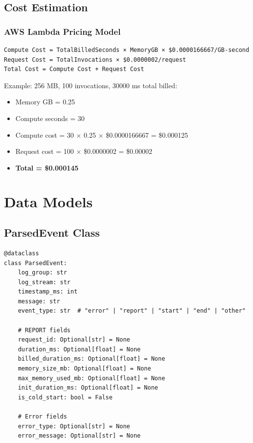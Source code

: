 \documentclass[12pt,a4paper]{article}
\begin{document}
\subsection{Cost Estimation}

\subsubsection{AWS Lambda Pricing Model}
\begin{verbatim}
Compute Cost = TotalBilledSeconds × MemoryGB × $0.0000166667/GB-second
Request Cost = TotalInvocations × $0.0000002/request
Total Cost = Compute Cost + Request Cost
\end{verbatim}

Example: 256 MB, 100 invocations, 30000 ms total billed:
\begin{itemize}
    \item Memory GB = 0.25
    \item Compute seconds = 30
    \item Compute cost = 30 × 0.25 × \$0.0000166667 = \$0.000125
    \item Request cost = 100 × \$0.0000002 = \$0.00002
    \item \textbf{Total = \$0.000145}
\end{itemize}

\pagebreak

\section{Data Models}

\subsection{ParsedEvent Class}
\lstset{language=Python, caption=ParsedEvent Data Class}
\begin{lstlisting}
@dataclass
class ParsedEvent:
    log_group: str
    log_stream: str
    timestamp_ms: int
    message: str
    event_type: str  # "error" | "report" | "start" | "end" | "other"
    
    # REPORT fields
    request_id: Optional[str] = None
    duration_ms: Optional[float] = None
    billed_duration_ms: Optional[float] = None
    memory_size_mb: Optional[float] = None
    max_memory_used_mb: Optional[float] = None
    init_duration_ms: Optional[float] = None
    is_cold_start: bool = False
    
    # Error fields
    error_type: Optional[str] = None
    error_message: Optional[str] = None
\end{lstlisting}
\end{document}

